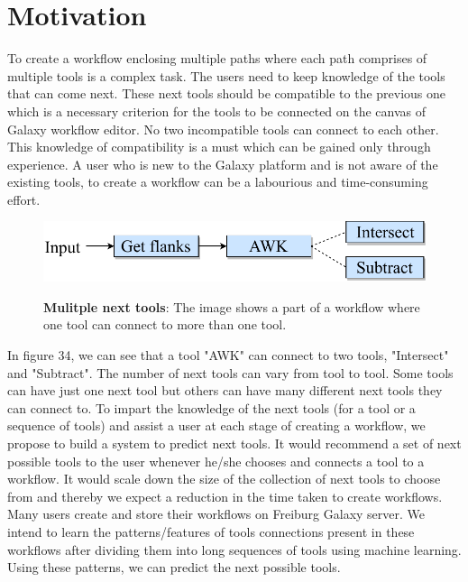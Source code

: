 \chapter{Motivation}\label{chap:motivation_wf}

To create a workflow enclosing multiple paths where each path comprises of multiple tools is a complex task. The users need to keep knowledge of the tools that can come next. These next tools should be compatible to the previous one which is a necessary criterion for the tools to be connected on the canvas of Galaxy workflow editor. No two incompatible tools can connect to each other. This knowledge of compatibility is a must which can be gained only through experience. A user who is new to the Galaxy platform and is not aware of the existing tools, to create a workflow can be a labourious and time-consuming effort. 

\begin{figure}[h]
\begin{centering}
    {\includegraphics[scale=0.7]{figures/multiple_next_tools_45cee2961bc05b20.pdf}}
    \caption[Multiple next tools]{\textbf{Mulitple next tools}: The image shows a part of a workflow where one tool can connect to more than one tool.}
\end{centering}
\end{figure}

In figure 34, we can see that a tool "AWK" can connect to two tools, "Intersect" and "Subtract". The number of next tools can vary from tool to tool. Some tools can have just one next tool but others can have many different next tools they can connect to. To impart the knowledge of the next tools (for a tool or a sequence of tools) and assist a user at each stage of creating a workflow, we propose to build a system to predict next tools. It would recommend a set of next possible tools to the user whenever he/she chooses and connects a tool to a workflow. It would scale down the size of the collection of next tools to choose from and thereby we expect a reduction in the time taken to create workflows. Many users create and store their workflows on Freiburg Galaxy server. We intend to learn the patterns/features of tools connections present in these workflows after dividing them into long sequences of tools using machine learning. Using these patterns, we can predict the next possible tools. 